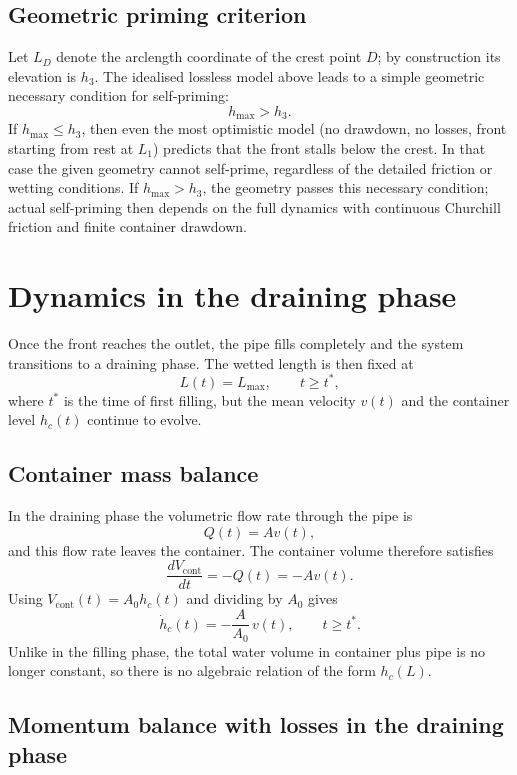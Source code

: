 \documentclass[11pt]{article}
\begin{document}
\subsection{Geometric priming criterion}

Let $L_D$ denote the arclength coordinate of the crest point $D$; by construction its elevation is $h_3$.
The idealised lossless model above leads to a simple geometric necessary condition for
self-priming:
\begin{equation}
  h_{\max} > h_3.
\end{equation}
If $h_{\max} \le h_3$, then even the most optimistic model (no drawdown, no losses, front
starting from rest at $L_1$) predicts that the front stalls below the crest. In that case the
given geometry cannot self-prime, regardless of the detailed friction or wetting conditions.
If $h_{\max} > h_3$, the geometry passes this necessary condition; actual self-priming then
depends on the full dynamics with continuous Churchill friction and finite container
drawdown.


\section{Dynamics in the draining phase}

Once the front reaches the outlet, the pipe fills completely and the system transitions to a
draining phase. The wetted length is then fixed at
\[
  L(t) = L_{\max},\qquad t \ge t^*,
\]
where $t^*$ is the time of first filling, but the mean velocity $v(t)$ and the container level
$h_c(t)$ continue to evolve.

\subsection{Container mass balance}

In the draining phase the volumetric flow rate through the pipe is
\[
  Q(t) = A v(t),
\]
and this flow rate leaves the container. The container volume therefore satisfies
\[
  \frac{dV_{\text{cont}}}{dt} = -Q(t) = -A v(t).
\]
Using $V_{\text{cont}}(t) = A_0 h_c(t)$ and dividing by $A_0$ gives
\begin{equation}
  \dot h_c(t) = -\frac{A}{A_0}\,v(t),\qquad t \ge t^*.
  \label{eq:drain-hc}
\end{equation}
Unlike in the filling phase, the total water volume in container plus pipe is no longer
constant, so there is no algebraic relation of the form $h_c(L)$.

\subsection{Momentum balance with losses in the draining phase}
\end{document}
